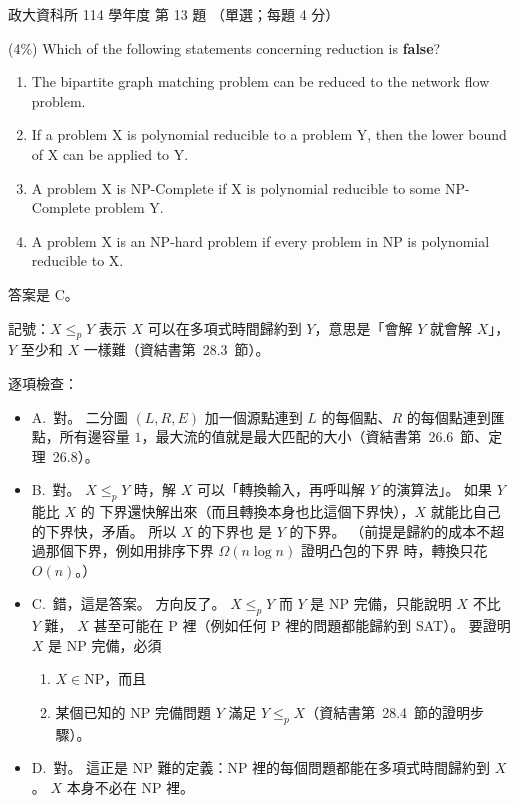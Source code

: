 \begin{pastexam}[label={px:nccu-114-dsa-13}]{政大資科所 114 學年度 第 13 題}
（單選；每題 4 分）

(4\%) Which of the following statements concerning reduction is \textbf{false}?
\begin{enumerate}[label=\Alph*.]
\item The bipartite graph matching problem can be reduced to the network flow problem.
\item If a problem X is polynomial reducible to a problem Y, then the lower bound of X can be
applied to Y.
\item A problem X is NP-Complete if X is polynomial reducible to some NP-Complete problem Y.
\item A problem X is an NP-hard problem if every problem in NP is polynomial reducible to X.
\end{enumerate}
\end{pastexam}

\begin{pastsoln}
答案是 C。

記號：$X \le_p Y$ 表示 $X$ 可以在多項式時間歸約到 $Y$，意思是「會解 $Y$ 就會解 $X$」，$Y$ 至少和
$X$ 一樣難（資結書第~28.3~節）。

逐項檢查：
\begin{itemize}
\item A.~對。 二分圖 $(L, R, E)$ 加一個源點連到 $L$ 的每個點、$R$ 的每個點連到匯點，所有邊容量
$1$，最大流的值就是最大匹配的大小（資結書第~26.6~節、定理~26.8）。
\item B.~對。 $X \le_p Y$ 時，解 $X$ 可以「轉換輸入，再呼叫解 $Y$ 的演算法」。 如果 $Y$ 能比 $X$ 的
下界還快解出來（而且轉換本身也比這個下界快），$X$ 就能比自己的下界快，矛盾。 所以 $X$ 的下界也
是 $Y$ 的下界。 （前提是歸約的成本不超過那個下界，例如用排序下界 $\Omega(n \log n)$ 證明凸包的下界
時，轉換只花 $O(n)$。）
\item C.~錯，這是答案。 方向反了。 $X \le_p Y$ 而 $Y$ 是 NP 完備，只能說明 $X$ 不比 $Y$ 難，
$X$ 甚至可能在 P 裡（例如任何 P 裡的問題都能歸約到 SAT）。 要證明 $X$ 是 NP 完備，必須
\begin{enumerate}
\item $X \in \mathrm{NP}$，而且
\item 某個已知的 NP 完備問題 $Y$ 滿足 $Y \le_p X$（資結書第~28.4~節的證明步驟）。
\end{enumerate}
\item D.~對。 這正是 NP 難的定義：NP 裡的每個問題都能在多項式時間歸約到 $X$。 $X$ 本身不必在 NP 裡。
\end{itemize}
\end{pastsoln}
